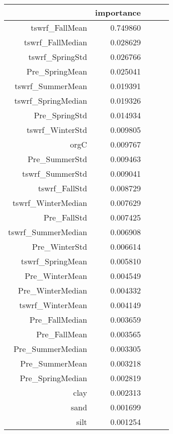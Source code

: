 \begin{tabular}{rrrrr}
\toprule
 & importance \\
\midrule
tswrf_FallMean & 0.749860 \\
tswrf_FallMedian & 0.028629 \\
tswrf_SpringStd & 0.026766 \\
Pre_SpringMean & 0.025041 \\
tswrf_SummerMean & 0.019391 \\
tswrf_SpringMedian & 0.019326 \\
Pre_SpringStd & 0.014934 \\
tswrf_WinterStd & 0.009805 \\
orgC & 0.009767 \\
Pre_SummerStd & 0.009463 \\
tswrf_SummerStd & 0.009041 \\
tswrf_FallStd & 0.008729 \\
tswrf_WinterMedian & 0.007629 \\
Pre_FallStd & 0.007425 \\
tswrf_SummerMedian & 0.006908 \\
Pre_WinterStd & 0.006614 \\
tswrf_SpringMean & 0.005810 \\
Pre_WinterMean & 0.004549 \\
Pre_WinterMedian & 0.004332 \\
tswrf_WinterMean & 0.004149 \\
Pre_FallMedian & 0.003659 \\
Pre_FallMean & 0.003565 \\
Pre_SummerMedian & 0.003305 \\
Pre_SummerMean & 0.003218 \\
Pre_SpringMedian & 0.002819 \\
clay & 0.002313 \\
sand & 0.001699 \\
silt & 0.001254 \\
\bottomrule
\end{tabular}
